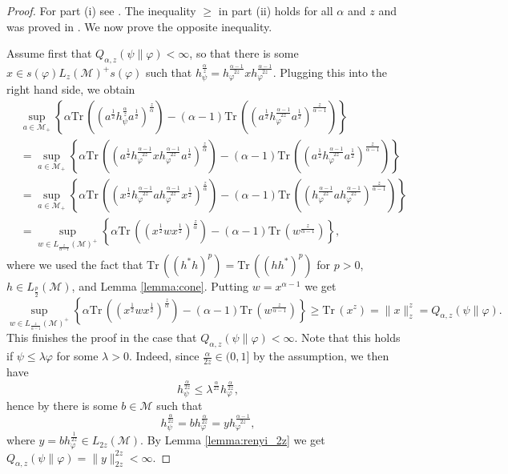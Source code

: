 \documentclass[12pt]{article}
\theoremstyle{definition}
\theoremstyle{remark}
\numberwithin{equation}{section}
\def\Me{\mathcal M}
\def \Tr{\mathrm{Tr}\,}
\begin{document}
\begin{proof} For part (i) see \cite[Theorem 1 (vi)]{kato2023onrenyi}. The
inequality $\ge$ in part (ii) holds for all $\alpha$ and $z$ and was proved in
\cite[Theorem 2 (vi)]{kato2023onrenyi}. We now prove the opposite inequality. 

Assume first that $Q_{\alpha,z}(\psi\|\varphi)<\infty$, so that there is some $x\in
s(\varphi)L_z(\Me)^+s(\varphi)$ such that
$h_\psi^{\frac{\alpha}{z}}=h_\varphi^{\frac{\alpha-1}{2z}}xh_\varphi^{\frac{\alpha-1}{2z}}$. Plugging this
into the right hand side, we obtain
\begin{align*}
&\sup_{a\in \Me_+} \left\{\alpha
\Tr\left((a^{\frac12}h_\psi^{\frac{\alpha}{z}}a^{\frac12})^{\frac{z}{\alpha}}\right)-(\alpha-1)
\Tr\left((a^{\frac12}h_\varphi^{\frac{\alpha-1}{2z}}a^{\frac12})^{\frac{z}{\alpha-1}}\right) \right\}\\
&=\sup_{a\in \Me_+} \left\{\alpha
\Tr\left((a^{\frac12}h_\varphi^{\frac{\alpha-1}{2z}}xh_\varphi^{\frac{\alpha-1}{2z}}
a^{\frac12})^{\frac{z}{\alpha}}\right)-(\alpha-1)
\Tr\left((a^{\frac12}h_\varphi^{\frac{\alpha-1}{2z}}a^{\frac12})^{\frac{z}{\alpha-1}}\right) \right\}\\
&=\sup_{a\in \Me_+} \left\{\alpha
\Tr\left((x^{\frac12}h_\varphi^{\frac{\alpha-1}{2z}}ah_\varphi^{\frac{\alpha-1}{2z}}
x^{\frac12})^{\frac{z}{\alpha}}\right)-(\alpha-1)
\Tr\left((h_\varphi^{\frac{\alpha-1}{2z}}a h_\varphi^{\frac{\alpha-1}{2z}}
)^{\frac{z}{\alpha-1}}\right)
\right\}\\
&=\sup_{w\in L_{\frac{z}{\alpha-1}}(\Me)^+} \left\{\alpha
\Tr\left((x^{\frac12}wx^{\frac12})^{\frac{z}{\alpha}}\right)-(\alpha-1)
\Tr\left(w^{\frac{z}{\alpha-1}}\right)
\right\},
\end{align*}
where we used the fact that $\Tr \left((h^*h)^p\right)=\Tr \left((hh^*)^p\right)$ for
$p>0$, $h\in L_{\frac{p}{2}}(\Me)$, and Lemma \ref{lemma:cone}.
 Putting $w=x^{\alpha-1}$ we
get
\[
\sup_{w\in L_{\frac{z}{\alpha-1}}(\Me)^+} \left\{\alpha
\Tr\left((x^{\frac12}wx^{\frac12})^{\frac{z}{\alpha}}\right)-(\alpha-1)
\Tr\left(w^{\frac{z}{\alpha-1}}\right)
\right\}\ge \Tr(x^z)=\|x\|_z^z= Q_{\alpha,z}(\psi\|\varphi).
\]
This finishes the proof in the case that $Q_{\alpha,z}(\psi\|\varphi)<\infty$.  Note that
this holds if $\psi\le \lambda\varphi$ for some $\lambda>0$. Indeed, since
$\frac{\alpha}{2z}\in (0,1]$ by the assumption, we then have 
\[
h_\psi^{\frac{\alpha}{2z}}\le \lambda^{\frac{\alpha}{2z}}h_\varphi^{\frac{\alpha}{2z}},
\]
hence by \cite[Lemma A.58]{hiai2021quantum} there is some $b\in \Me$ such that 
\[
h_\psi^{\frac{\alpha}{2z}}=bh_\varphi^{\frac{\alpha}{2z}}=yh_\varphi^{\frac{\alpha-1}{2z}},
\]
where $y=bh_\varphi^{\frac{1}{2z}}\in L_{2z}(\Me)$. By Lemma \ref{lemma:renyi_2z} we get 
$Q_{\alpha,z}(\psi\|\varphi)=\|y\|_{2z}^{2z}<\infty$. 


\end{proof}
\end{document}

